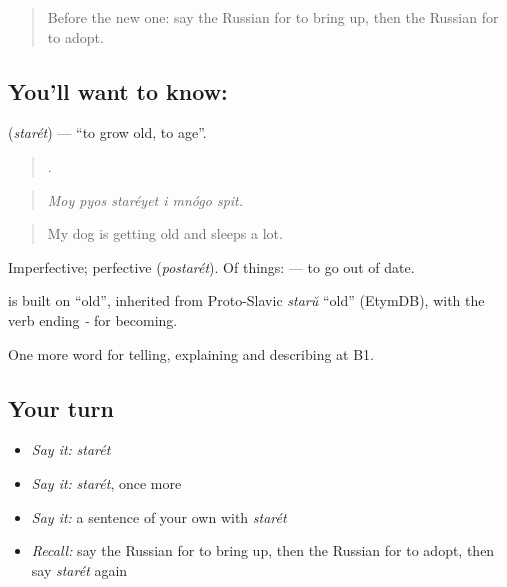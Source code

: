 \label{lesson:RU-C305-staret}



\begin{quote}
Before the new one: say the Russian for to bring up, then the Russian for to adopt.
\end{quote}

\subsection*{You'll want to know: }
\textbf{} (\emph{starét}) — \textquotedblleft{}to grow old, to age\textquotedblright{}.

\begin{quote}
     .
\end{quote}

\begin{quote}
\emph{Moy pyos staréyet i mnógo spit.}
\end{quote}

\begin{quote}
My dog is getting old and sleeps a lot.
\end{quote}

Imperfective; perfective \emph{} (\emph{postarét}). Of things: \emph{} — to go out of date.

\begin{cousinweb}
\emph{} is built on \emph{} \textquotedblleft{}old\textquotedblright{}, inherited from Proto-Slavic \emph{starŭ} \textquotedblleft{}old\textquotedblright{} (EtymDB), with the verb ending \emph{-} for becoming.
\end{cousinweb}

\begin{grammarlens}[title={What you've built}]
One more word for telling, explaining and describing at B1.
\end{grammarlens}

\subsection*{Your turn}
\begin{itemize}
\raggedright
  \item \emph{Say it:} \emph{starét}
  \item \emph{Say it:} \emph{starét}, once more
  \item \emph{Say it:} a sentence of your own with \emph{starét}
  \item \emph{Recall:} say the Russian for to bring up, then the Russian for to adopt, then say \emph{starét} again
\end{itemize}


